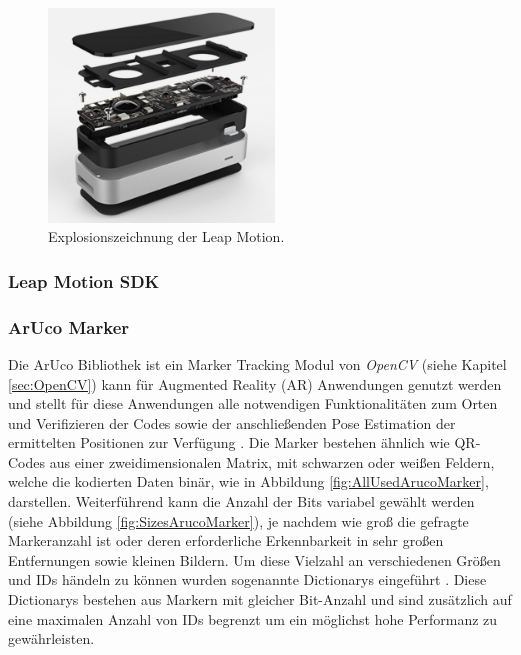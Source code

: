 \begin{figure}[H]
	\centering
	\includegraphics[width=6cm]{Bilder/leap-motion.png}			
		\caption{Explosionszeichnung der Leap Motion.~\cite{website:LeapMotionBlog}}
		\label{fig:leapMotion}
\end{figure}

\subsubsection{Leap Motion SDK} \label{sec:LeapSDK}
\subsubsection{ArUco Marker} \label{sec:aruco} 
Die ArUco Bibliothek ist ein Marker Tracking Modul von \textit{OpenCV} (siehe Kapitel \ref{sec:OpenCV}) kann für Augmented Reality (AR) Anwendungen genutzt werden und stellt für diese Anwendungen alle notwendigen Funktionalitäten zum Orten und Verifizieren der Codes sowie der anschließenden Pose Estimation der ermittelten Positionen zur Verfügung \cite{article:Aruco2014}. 
Die Marker bestehen ähnlich wie QR-Codes aus einer zweidimensionalen Matrix, mit schwarzen oder weißen Feldern, welche die kodierten Daten binär, wie in Abbildung \ref{fig:AllUsedArucoMarker}, darstellen.  Weiterführend kann die Anzahl der Bits variabel gewählt werden (siehe Abbildung \ref{fig:SizesArucoMarker}), je nachdem wie groß die gefragte Markeranzahl ist oder deren erforderliche Erkennbarkeit in sehr großen Entfernungen sowie kleinen Bildern. Um diese Vielzahl an verschiedenen Größen und IDs händeln zu können wurden sogenannte Dictionarys eingeführt \cite{article:ArucoDictGarridoJurado2015}. Diese Dictionarys bestehen aus Markern mit gleicher Bit-Anzahl und sind zusätzlich auf eine maximalen Anzahl von IDs begrenzt um ein möglichst hohe Performanz zu gewährleisten.\\



